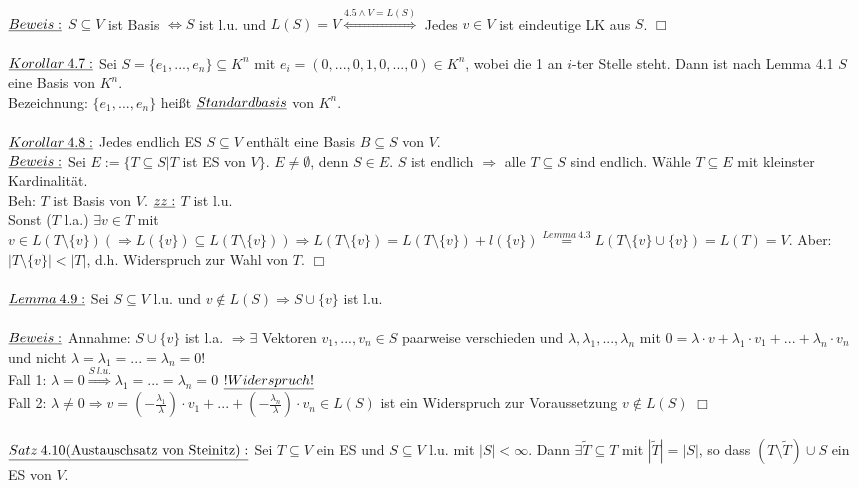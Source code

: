 \documentclass[fleqn, a4paper, 11pt]{article}
\begin{document}
\\
$\uline{Beweis:}$ $S\subseteq V$ ist Basis $\Leftrightarrow S$ ist l.u. und $L(S)=V \stackrel{4.5\wedge V=L(S)}{\Leftrightarrow}$ Jedes $v\in V$ ist eindeutige LK aus $S$. \hfill $\Box$\\
\\
$\uline{Korollar\:4.7:}$ Sei $S=\{e_1,...,e_n\}\subseteq K^n$ mit $e_i =(0,...,0,1,0,...,0)\in K^n$, wobei die 1 an $i$-ter Stelle steht. Dann ist nach Lemma 4.1 $S$ eine Basis von $K^n$.\\
Bezeichnung: $\{e_1,...,e_n\}$ hei\ss{}t $\uline{Standardbasis}$ von $K^n$.\\
\\
$\uline{Korollar\:4.8:}$ Jedes endlich ES $S\subseteq V$ enth\"alt eine Basis $B\subseteq S$ von $V$.\\
$\uline{Beweis:}$ Sei $E:=\{T\subseteq S| T$ ist ES von $V\}$. $E\neq\emptyset$, denn $S\in E$. $S$ ist endlich $\Rightarrow$ alle $T\subseteq S$ sind endlich. W\"ahle $T\subseteq E$ mit kleinster Kardinalit\"at.\\
Beh: $T$ ist Basis von $V$. $\uline{zz:}$ $T$ ist l.u.\\
Sonst ($T$ l.a.) $\exists v\in T$ mit $v\in L(T\setminus\{v\})(\Rightarrow L(\{v\})\subseteq L(T\setminus\{v\}))\Rightarrow L(T\setminus\{v\})=L(T\setminus\{v\})+l(\{v\})\stackrel{Lemma\:4.3}{=} L(T\setminus\{v\}\cup\{v\})=L(T)=V$. Aber: $| T\setminus\{v\} | < | T |$, d.h. Widerspruch zur Wahl von $T$. \hfill $\Box$\\
\\
$\uline{Lemma\:4.9:}$ Sei $S\subseteq V$ l.u. und $v\notin L(S)\Rightarrow S\cup\{v\}$ ist l.u.\\
\\
$\uline{Beweis:}$ Annahme: $S\cup\{v\}$ ist l.a. $\Rightarrow \exists$ Vektoren $v_1,...,v_n\in S$ paarweise verschieden und $\lambda,\lambda_1,...,\lambda_n$ mit $0=\lambda\cdot v+\lambda_1\cdot v_1 +...+\lambda_n\cdot v_n$ und nicht $\lambda=\lambda_1=...=\lambda_n=0!$\\
Fall 1: $\lambda =0\stackrel{S\:l.u.}{\Rightarrow}\lambda_1 =...=\lambda_n =0$ $\uline{!Widerspruch!}$\\
Fall 2: $\lambda\neq0\Rightarrow v=(-\tfrac{\lambda_1}{\lambda})\cdot v_1 +...+ (-\tfrac{\lambda_n}{\lambda})\cdot v_n \in L(S)$ ist ein Widerspruch zur Voraussetzung $v\notin L(S)$ \hfill $\Box$\\
\\
$\uline{Satz\:4.10(\text{Austauschsatz von Steinitz}):}$ Sei $T\subseteq V$ ein ES und $S\subseteq V$ l.u. mit $|S| < \infty$. Dann $\exists\tilde{T}\subseteq T$ mit $|\tilde{T}|=|S|$, so dass $(T\setminus\tilde{T})\cup S$ ein ES von $V$.\\
\end{document}
